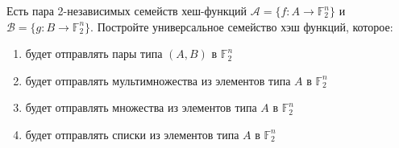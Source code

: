 \begin{task}[2]
Есть пара 2-независимых семейств хеш-функций $\mathcal{A} = \{ f:A\rightarrow \mathbb{F}_2^n \}$ и 
$\mathcal{B} = \{ g:B\rightarrow \mathbb{F}_2^n \}$. Постройте универсальное семейство хэш функций, которое:
\begin{enumerate}[label=(\alph*)]
	\item будет отправлять пары типа $(A, B)$ в $\mathbb{F}^n_2$
	\item будет отправлять мультимножества из элементов типа $A$ в $\mathbb{F}^n_2$
	\item будет отправлять множества из элементов типа $A$ в $\mathbb{F}^n_2$
	\item будет отправлять списки из элементов типа $A$ в $\mathbb{F}^n_2$
\end{enumerate}
\end{task}
